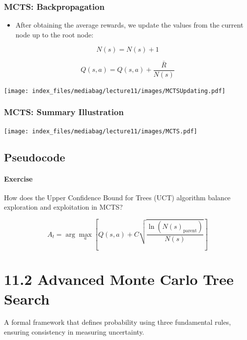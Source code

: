 \documentclass[
  letterpaper,
  DIV=11,
  numbers=noendperiod]{scrreprt}
\providecommand{\tightlist}{%
  \setlength{\itemsep}{0pt}\setlength{\parskip}{0pt}}\usepackage{longtable,booktabs,array}
\begin{document}
\subsection{MCTS: Backpropagation}\label{mcts-backpropagation}

\begin{itemize}
\tightlist
\item
  After obtaining the average rewards, we update the values from the
  current node up to the root node:
\end{itemize}

\[
N(s) = N(s) + 1
\]

\[
Q(s,a) = Q(s,a) + \frac{\bar{R}}{N(s)}
\]

\texttt{[image: index\_files/mediabag/lecture11/images/MCTSUpdating.pdf]}

\subsection{MCTS: Summary Illustration}\label{mcts-summary-illustration}

\texttt{[image: index\_files/mediabag/lecture11/images/MCTS.pdf]}

\section{Pseudocode}\label{pseudocode-16}

\subsubsection{\texorpdfstring{ Exercise
}{ Exercise }}\label{exercise-17}

How does the Upper Confidence Bound for Trees (UCT) algorithm balance
exploration and exploitation in MCTS?

\[
A_t = \arg\max_a \left[ Q(s,a) + C \sqrt{\frac{\ln(N(s)_{\text{parent}})}{N(s)}} \right]
\]

\chapter{11.2 Advanced Monte Carlo Tree
Search}\label{advanced-monte-carlo-tree-search}

\begin{tcolorbox}[enhanced jigsaw, colback=white, left=2mm, breakable, opacityback=0, bottomrule=.15mm, rightrule=.15mm, arc=.35mm, colframe=quarto-callout-note-color-frame, leftrule=.75mm, toprule=.15mm]

A formal framework that defines probability using three fundamental
rules, ensuring consistency in measuring uncertainty. 🎲

\end{tcolorbox}
\end{document}
